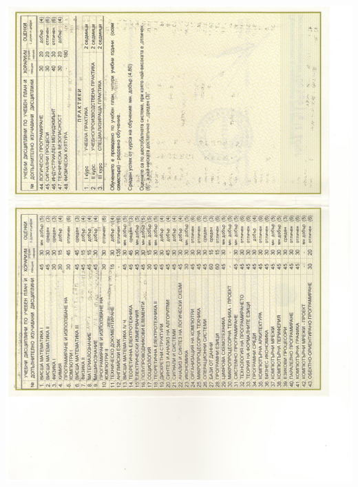 \documentclass[english,a4paper]{europasscv}
\begin{document}
\includegraphics[width=\textwidth,height=\textheight,keepaspectratio]{DiplomaTU2010_4}
\end{document}
